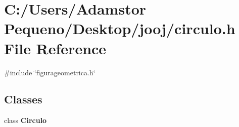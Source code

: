 \section{C\+:/\+Users/\+Adamstor Pequeno/\+Desktop/jooj/circulo.h File Reference}
\label{circulo_8h}
{\ttfamily \#include \char`\"{}figurageometrica.\+h\char`\"{}}\newline
\subsection*{Classes}
\begin{DoxyCompactItemize}
\item 
class \textbf{ Circulo}
\end{DoxyCompactItemize}
